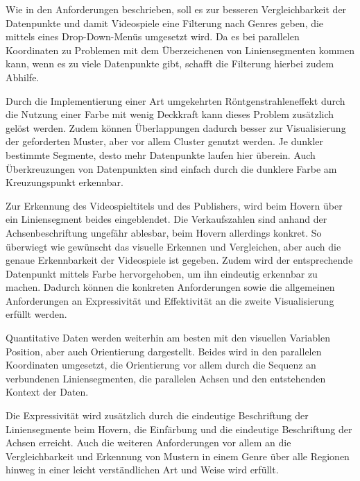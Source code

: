 \documentclass[usegeometry=true]{scrartcl}
\begin{document}
Wie in den Anforderungen beschrieben, soll es zur besseren Vergleichbarkeit der Datenpunkte und damit Videospiele eine Filterung nach Genres geben, die mittels eines Drop-Down-Menüs umgesetzt wird. 
Da es bei parallelen Koordinaten zu Problemen mit dem Überzeichenen von Liniensegmenten kommen kann, wenn es zu viele Datenpunkte gibt, schafft die Filterung hierbei zudem Abhilfe. 

Durch die Implementierung einer Art umgekehrten Röntgenstrahleneffekt durch die Nutzung einer Farbe mit wenig Deckkraft kann dieses Problem zusätzlich gelöst werden. 
Zudem können Überlappungen dadurch besser zur Visualisierung der geforderten Muster, aber vor allem Cluster genutzt werden. 
Je dunkler bestimmte Segmente, desto mehr Datenpunkte laufen hier überein. 
Auch Überkreuzungen von Datenpunkten sind einfach durch die dunklere Farbe am Kreuzungspunkt erkennbar. 

Zur Erkennung des Videospieltitels und des Publishers, wird beim Hovern über ein Liniensegment beides eingeblendet. 
Die Verkaufszahlen sind anhand der Achsenbeschriftung ungefähr ablesbar, beim Hovern allerdings konkret. 
So überwiegt wie gewünscht das visuelle Erkennen und Vergleichen, aber auch die genaue Erkennbarkeit der Videospiele ist gegeben.
Zudem wird der entsprechende Datenpunkt mittels Farbe hervorgehoben, um ihn eindeutig erkennbar zu machen. 
Dadurch können die konkreten Anforderungen sowie die allgemeinen Anforderungen an Expressivität und Effektivität an die zweite Visualisierung  erfüllt werden. 

Quantitative Daten werden weiterhin am besten mit den visuellen Variablen Position, aber auch Orientierung dargestellt.
Beides wird in den parallelen Koordinaten umgesetzt, die Orientierung vor allem durch die Sequenz an verbundenen Liniensegmenten, die parallelen Achsen und den entstehenden Kontext der Daten. 

Die Expressivität wird zusätzlich durch die eindeutige Beschriftung der Liniensegmente beim Hovern, die Einfärbung und die eindeutige Beschriftung der Achsen erreicht. 
Auch die weiteren Anforderungen vor allem an die Vergleichbarkeit und Erkennung von Mustern in einem Genre über alle Regionen hinweg in einer leicht verständlichen Art und Weise wird erfüllt.
\end{document}
